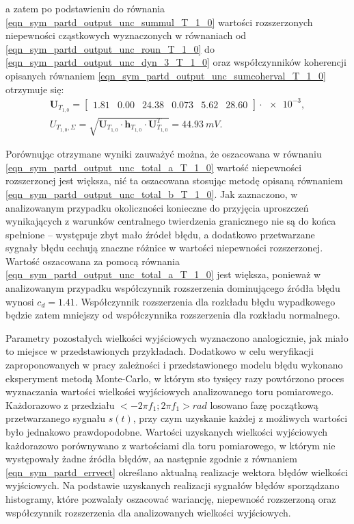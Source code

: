 a zatem po podstawieniu do równania \eqref{eqn_sym_partd_output_unc_summul_T_1_0} wartości rozszerzonych niepewności cząstkowych wyznaczonych w równaniach od \eqref{eqn_sym_partd_output_unc_roun_T_1_0} do \eqref{eqn_sym_partd_output_unc_dyn_3_T_1_0} oraz współczynników koherencji opisanych równaniem \eqref{eqn_sym_partd_output_unc_sumcoherval_T_1_0} otrzymuje się:
\begin{gather}
\mathbf{U}_{T_{1,0}} = 
\begin{bmatrix}
\num{1.81} & \num{0.00} & \num{24.38} & \num{0.073} & \num{5.62} & \num{28.60}
\end{bmatrix} \cdot \num{e-3}
\label{eqn_sym_partd_output_unc_sumuvectval_T_1_0}, \\
U_{T_{1,0},\Sigma} = \sqrt{\mathbf{U}_{T_{1,0}} \cdot \mathbf{h}_{T_{1,0}} \cdot \mathbf{U}_{T_{1,0}}^{T}} = \qty{44.93}{mV} \label{eqn_sym_partd_output_unc_total_b_T_1_0}.
\end{gather}

Porównując otrzymane wyniki zauważyć można, że oszacowana w równaniu \eqref{eqn_sym_partd_output_unc_total_a_T_1_0} wartość niepewności rozszerzonej jest większa, nić ta oszacowana stosując metodę opisaną równaniem \eqref{eqn_sym_partd_output_unc_total_b_T_1_0}. Jak zaznaczono, w analizowanym przypadku okoliczności konieczne do przyjęcia uproszczeń wynikających z warunków centralnego twierdzenia granicznego nie są do końca spełnione -- występuje zbyt mało źródeł błędu, a dodatkowo przetwarzane sygnały błędu cechują znaczne różnice w wartości niepewności rozszerzonej. Wartość oszacowana za pomocą równania \eqref{eqn_sym_partd_output_unc_total_a_T_1_0} jest większa, ponieważ w analizowanym przypadku współczynnik rozszerzenia dominującego źródła błędu wynosi $c_{d} = 1.41$. Współczynnik rozszerzenia dla rozkładu błędu wypadkowego będzie zatem mniejszy od współczynnika rozszerzenia dla rozkładu normalnego.

Parametry pozostałych wielkości wyjściowych wyznaczono analogicznie, jak miało to miejsce w przedstawionych przykładach. Dodatkowo w celu weryfikacji zaproponowanych w pracy zależności i przedstawionego modelu błędu wykonano eksperyment metodą Monte-Carlo, w którym sto tysięcy razy powtórzono proces wyznaczania wartości wielkości wyjściowych analizowanego toru pomiarowego. Każdorazowo z przedziału $<-2 \pi f_{1};2 \pi f_{1}>\unit{rad}$ losowano fazę początkową przetwarzanego sygnału $s(t)$, przy czym uzyskanie każdej z możliwych wartości było jednakowo prawdopodobne. Wartości uzyskanych wielkości wyjściowych każdorazowo porównywano z wartościami dla toru pomiarowego, w którym nie występowały żadne źródła błędów, aa następnie zgodnie z równaniem \eqref{eqn_sym_partd_errvect} określano aktualną realizacje wektora błędów wielkości wyjściowych. Na podstawie uzyskanych realizacji sygnałów błędów sporządzano histogramy, które pozwalały oszacować wariancję, niepewność rozszerzoną oraz współczynnik rozszerzenia dla analizowanych wielkości wyjściowych.

